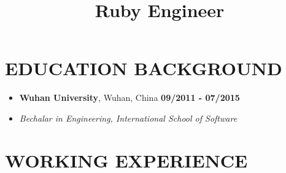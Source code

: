 \documentclass[12pt, a4paper,sans]{moderncv}       %
\title{Ruby Engineer}                               %
\begin{document}
\makecvtitle
\vspace{-28pt}

\section{EDUCATION BACKGROUND}
    \begin{itemize}
        \item{\textbf{Wuhan University}, {Wuhan, China} \hfill\textbf{09/2011 - 07/2015}}
    \end{itemize}

    \begin{itemize}
        \item{\textit{Bechalar in Engineering, International School of Software}}
    \end{itemize}

\vspace{0pt}


\section{WORKING EXPERIENCE}
\end{document}
